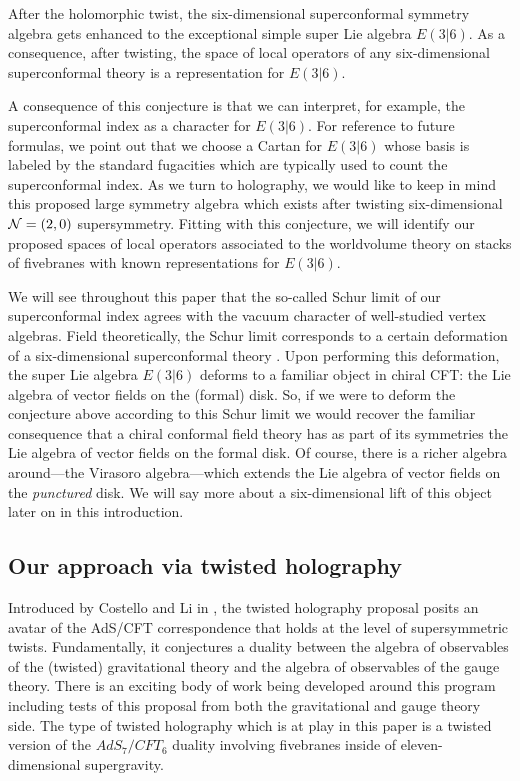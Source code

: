 \documentclass[11pt]{amsart}
\begin{document}
\begin{conj}
After the holomorphic twist, the six-dimensional superconformal symmetry algebra gets enhanced to the exceptional simple super Lie algebra $E(3|6)$.
As a consequence, after twisting, the space of local operators of any six-dimensional superconformal theory is a representation for $E(3|6)$.
\end{conj}

A consequence of this conjecture is that we can interpret, for example, the superconformal index as a character for $E(3|6)$. 
For reference to future formulas, we point out that we choose a Cartan for $E(3|6)$ whose basis is labeled by the standard fugacities which are typically used to count the superconformal index.
As we turn to holography, we would like to keep in mind this proposed large symmetry algebra which exists after twisting six-dimensional $\mathcal N=(2,0)$ supersymmetry. 
Fitting with this conjecture, we will identify our proposed spaces of local operators associated to the worldvolume theory on stacks of fivebranes with known representations for $E(3|6)$. 

We will see throughout this paper that the so-called Schur limit of our superconformal index agrees with the vacuum character of well-studied vertex algebras. 
Field theoretically, the Schur limit corresponds to a certain deformation of a six-dimensional superconformal theory \cite{Beemetal}. 
Upon performing this deformation, the super Lie algebra $E(3|6)$ deforms to a familiar object in chiral CFT: the Lie algebra of vector fields on the (formal) disk.
So, if we were to deform the conjecture above according to this Schur limit we would recover the familiar consequence that a chiral conformal field theory has as part of its symmetries the Lie algebra of vector fields on the formal disk.
Of course, there is a richer algebra around---the Virasoro algebra---which extends the Lie algebra of vector fields on the {\em punctured} disk. 
We will say more about a six-dimensional lift of this object later on in this introduction.

\subsection{Our approach via twisted holography}
Introduced by Costello and Li in \cite{CLsugra}, the twisted holography proposal posits an avatar of the AdS/CFT correspondence that holds at the level of supersymmetric twists. 
Fundamentally, it conjectures a duality between the algebra of observables of the (twisted) gravitational theory and the algebra of observables of the gauge theory.
There is an exciting body of work being developed around this program including tests of this proposal from both the gravitational and gauge theory side.
The type of twisted holography which is at play in this paper is a twisted version of the $AdS_7/CFT_6$ duality involving fivebranes inside of eleven-dimensional supergravity.  
\end{document}
